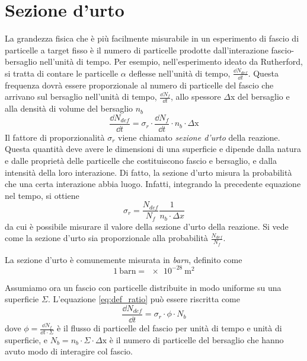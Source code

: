 \documentclass[../main.tex]{subfiles}
\begin{document}
\section{Sezione d'urto}
La grandezza fisica che è più facilmente misurabile in un esperimento di fascio di particelle a target fisso è il numero di particelle prodotte dall'interazione fascio-bersaglio nell'unità di tempo. Per esempio, nell'esperimento ideato da Rutherford, si tratta di contare le particelle $\alpha$ deflesse nell'unità di tempo, $\frac{\dd N_{def}}{\dd t}$. 
Questa frequenza dovrà essere proporzionale al numero di particelle del fascio che arrivano sul bersaglio nell'unità di tempo, $\frac{\dd N_f}{\dd t}$, allo spessore $\Delta$x del bersaglio e alla densità di volume del bersaglio $n_b$
\begin{equation} \label{eq:def_ratio}
    \frac{\dd N_{def}}{\dd t} = \sigma_r \cdot \frac{\dd N_f}{\dd t} \cdot n_b \cdot \Delta \mathrm{x}
\end{equation}
Il fattore di proporzionalità $\sigma_r$ viene chiamato \emph{sezione d'urto} della reazione. Questa quantità deve avere le dimensioni di una superficie e dipende dalla natura e dalle proprietà delle particelle che costituiscono fascio e bersaglio, e dalla intensità della loro interazione. Di fatto, la sezione d'urto misura la probabilità che una certa interazione abbia luogo. Infatti, integrando la precedente equazione nel tempo, si ottiene 
\begin{equation}
    \sigma_r = \frac{N_{def}}{N_f} \frac{1}{n_b \cdot \Delta x}
\end{equation}
da cui è possibile misurare il valore della sezione d'urto della reazione. Si vede come la sezione d'urto sia proporzionale alla probabilità $\frac{N_{def}}{N_f}$.

La sezione d'urto è comunemente misurata in \emph{barn}, definito come
\begin{equation}
    1\ \mathrm{barn} = \SI{e-28}{\m ^2}
\end{equation}

Assumiamo ora un fascio con particelle distribuite in modo uniforme su una superficie $\Sigma$. L'equazione \ref{eq:def_ratio} può essere riscritta come 
\begin{equation}
    \frac{\dd N_{def}}{\dd t} = \sigma_r \cdot \phi \cdot N_b
\end{equation}
dove $\phi = \frac{\dd N_f}{\dd t \cdot \Sigma}$ è il flusso di particelle del fascio per unità di tempo e unità di superficie, e $N_b = n_b \cdot \Sigma \cdot \Delta \mathrm{x}$ è il numero di particelle del bersaglio che hanno avuto modo di interagire col fascio. 
\end{document}

